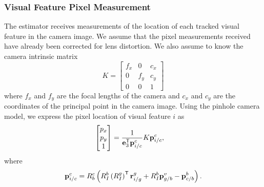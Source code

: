 \subsubsection{Visual Feature Pixel Measurement}
The estimator receives measurements of
the location of each tracked visual feature in the camera image. We assume that the
pixel measurements received have already been corrected for lens distortion.
We also assume to know the camera intrinsic matrix
\begin{equation}
  K =
  \begin{bmatrix}
    f_x & 0 & c_x \\
    0 & f_y & c_y \\
    0 & 0 & 1
  \end{bmatrix}
\end{equation}
where $f_x$ and $f_y$ are the focal lengths of the camera and $c_x$ and $c_y$
are the coordinates of the principal point in the camera image.
Using the pinhole camera model, we express the pixel location of
visual feature $i$ as
\begin{align}
  \begin{bmatrix}
    p_x \\ p_y \\ 1
  \end{bmatrix} &= \frac{1}{\boldsymbol{\mathrm{e}}_3^{\mathsf{T}} \boldsymbol{\mathrm{p}}_{i/c}^c} K
  \boldsymbol{\mathrm{p}}_{i/c}^c,
\end{align}
where
\begin{align}
  \boldsymbol{\mathrm{p}}_{i/c}^c = R_b^c \left( R_I^b \left( R_I^g \right)^{\mathsf{T}}
  \boldsymbol{\mathrm{r}}_{i/g}^g + R_I^b \boldsymbol{\mathrm{p}}_{g/b}^v - \boldsymbol{\mathrm{p}}_{c/b}^b \right).
  \label{eq:p_i_c_c}
\end{align}
